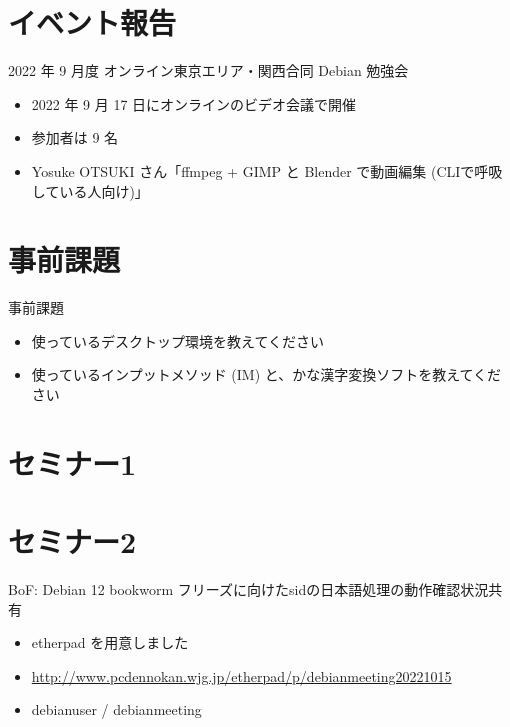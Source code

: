 \section{イベント報告}

\begin{frame}{2022 年 9 月度 オンライン東京エリア・関西合同 Debian 勉強会}
\begin{itemize}
\item 2022 年 9 月 17 日にオンラインのビデオ会議で開催
\item 参加者は 9 名
\item Yosuke OTSUKI さん「ffmpeg + GIMP と Blender で動画編集 (CLIで呼吸している人向け)」
\end{itemize}
\end{frame}


\section{事前課題}


\begin{frame}{事前課題}
  \begin{itemize}
  \item 使っているデスクトップ環境を教えてください
  \item 使っているインプットメソッド (IM) と、かな漢字変換ソフトを教えてください
  \end{itemize}
\end{frame}

{\footnotesize
 
}

%

\section{セミナー1}

\section{セミナー2}

\begin{frame}{BoF: Debian 12 bookworm フリーズに向けたsidの日本語処理の動作確認状況共有}
  \begin{itemize}
  \item etherpad を用意しました
  \item \url{http://www.pcdennokan.wjg.jp/etherpad/p/debianmeeting20221015}
  \item debianuser / debianmeeting
  \end{itemize}
\end{frame}


